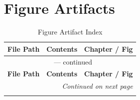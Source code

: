 \section{Figure Artifacts}

\begin{small}
\begin{longtable}{@{}p{3.8cm}p{4.2cm}p{3.2cm}@{}}
\caption{Figure Artifact Index} \label{tab:artifact-fig} \\
\toprule
\textbf{File Path} & \textbf{Contents} & \textbf{Chapter / Fig} \\
\midrule
\endfirsthead

\multicolumn{3}{c}{\tablename\ \thetable{} --- continued} \\
\toprule
\textbf{File Path} & \textbf{Contents} & \textbf{Chapter / Fig} \\
\midrule
\endhead

\midrule
\multicolumn{3}{r}{\textit{Continued on next page}} \\
\endfoot

\bottomrule
\endlastfoot


\end{longtable}
\end{small}
